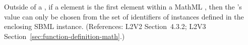 Outside of a \FunctionDefinition, if a  element is the
first element within a MathML , then the 's
value can only be chosen from the set of identifiers of
\FunctionDefinition{} instances defined in the
enclosing SBML \Model instance.
(References: L2V2 Section~4.3.2; L2V3
Section~\ref{sec:function-definition-math}.)
